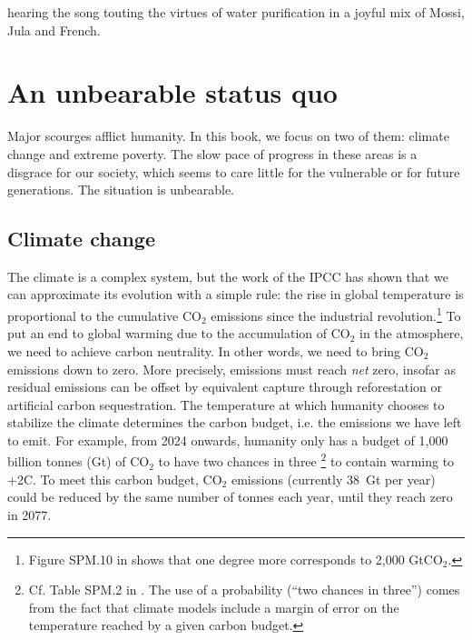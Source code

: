 \documentclass[a5paper,english,openany]{memoir}
\begin{document}
hearing the song touting the virtues of water purification in a joyful mix of Mossi, Jula and French.

\chapter{An unbearable status quo\label{ch:statu_quo}}

Major scourges afflict humanity. In this book, we focus on two of them: climate change and extreme poverty. The slow pace of progress in these areas is a disgrace for our society, which seems to care little for the vulnerable or for future generations. The situation is unbearable.

\section{Climate change}

The climate is a complex system, but the work of the IPCC has shown that we can approximate its evolution with a simple rule: the rise in global temperature is proportional to the cumulative CO$_\text{2}$ emissions since the industrial revolution.\footnote{Figure SPM.10 in \citet{ipcc_climate_2021} shows that one degree more corresponds to 2,000 GtCO$_\text{2}$.} 
To put an end to global warming due to the accumulation of CO$_\text{2}$ in the atmosphere, we need to achieve carbon neutrality. In other words, we need to bring CO$_\text{2}$ emissions down to zero. More precisely, emissions must reach \textit{net} zero, insofar as residual emissions can be offset by equivalent capture through reforestation or artificial carbon sequestration. The temperature at which humanity chooses to stabilize the climate determines the carbon budget, i.e. the emissions we have left to emit. For example, from 2024 onwards, humanity only has a budget of 1,000 billion tonnes (Gt) of CO$_\text{2}$ to have two chances in three%
\footnote{Cf. Table SPM.2 in \citet{ipcc_climate_2021}. The use of a probability (``two chances in three'') comes from the fact that climate models include a margin of error on the temperature reached by a given carbon budget.} 
to contain warming to +2\textdegree{}C. 
To meet this carbon budget, CO$_\text{2}$ emissions (currently 38~Gt per year) could be reduced by the same number of tonnes each year, until they reach zero in 2077.  %
\end{document}
